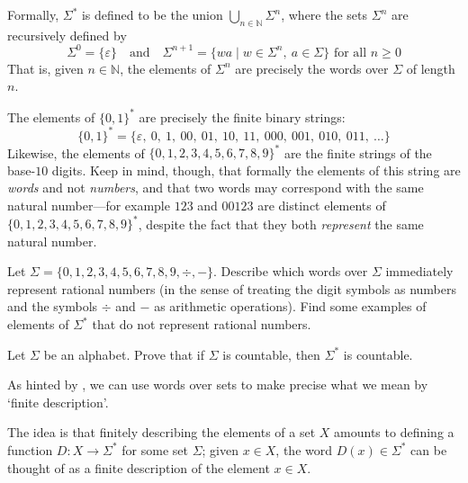 Formally, $\Sigma^*$ is defined to be the union $\displaystyle\bigcup_{n \in \mathbb{N}} \Sigma^n$, where the sets $\Sigma^n$ are recursively defined by
\[ \Sigma^0 = \{ \varepsilon \} \quad \text{and} \quad \Sigma^{n+1} = \{ wa \mid w \in \Sigma^n,~ a \in \Sigma \} \text{ for all } n \ge 0 \]
That is, given $n \in \mathbb{N}$, the elements of $\Sigma^n$ are precisely the words over $\Sigma$ of length $n$.

\begin{example}
\label{exSomeExamplesOfFiniteStrings}
The elements of $\{ 0,1 \}^*$ are precisely the finite binary strings:
\[ \{ 0,1 \}^* = \{ \varepsilon,~ 0,~ 1,~ 00,~ 01,~ 10,~ 11,~ 000,~ 001,~ 010,~ 011,~ \dots \} \]
Likewise, the elements of $\{ 0,1,2,3,4,5,6,7,8,9 \}^*$ are the finite strings of the base-$10$ digits. Keep in mind, though, that formally the elements of this string are \textit{words} and not \textit{numbers}, and that two words may correspond with the same natural number---for example $123$ and $00123$ are distinct elements of $\{ 0,1,2,3,4,5,6,7,8,9 \}^*$, despite the fact that they both \textit{represent} the same natural number.
\end{example}

\begin{exercise}
Let $\Sigma = \{ 0,1,2,3,4,5,6,7,8,9,{\div},{-} \}$. Describe which words over $\Sigma$ immediately represent rational numbers (in the sense of treating the digit symbols as numbers and the symbols $\div$ and $-$ as arithmetic operations). Find some examples of elements of $\Sigma^*$ that do not represent rational numbers.
\end{exercise}

\begin{exercise}
Let $\Sigma$ be an alphabet. Prove that if $\Sigma$ is countable, then $\Sigma^*$ is countable.
\end{exercise}

As hinted by , we can use words over sets to make precise what we mean by `finite description'.

The idea is that finitely describing the elements of a set $X$ amounts to defining a function $D : X \to \Sigma^*$ for some set $\Sigma$; given $x \in X$, the word $D(x) \in \Sigma^*$ can be thought of as a finite description of the element $x \in X$.

